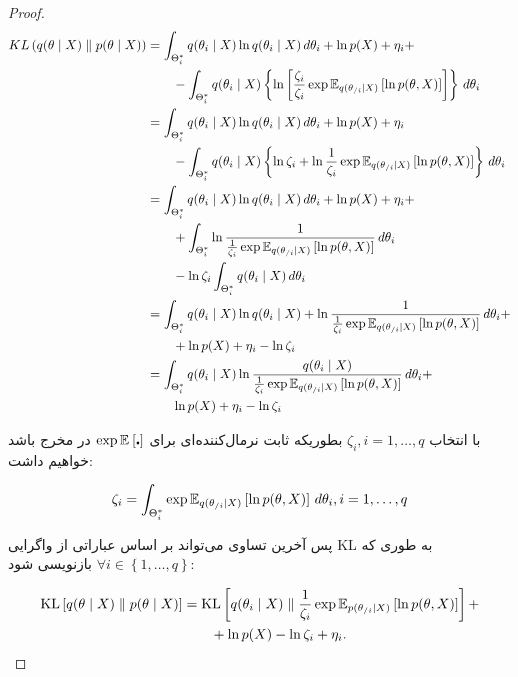 \begin{proof}
\begin{align*}
KL \left(  q ( \theta \mid X )  \parallel  p ( \theta \mid X )  \right)
	&= \int_{\Theta_i^*}  q ( \theta_i \mid X )  \ln  q ( \theta_i \mid X )  \,d\theta_i + \ln  p ( X )  + \eta_i +			\\
		& \qquad - \int_{\Theta_i^*}  q ( \theta_i \mid X )  \left\{
			\ln \left[
				\frac{\zeta_i}{\zeta_i} \exp  \mathbb{E}_{ q ( \theta_{/i} \mid X ) } \left[ \ln  p ( \theta, X )  \right]  \right] \right\} \,d\theta_i	\\
	&= \int_{\Theta_i^*}  q ( \theta_i \mid X )  \ln  q ( \theta_i \mid X )  \,d\theta_i + \ln  p ( X )  + \eta_i				\\
		& \qquad - \int_{\Theta_i^*}  q ( \theta_i \mid X )  \left\{
			\ln \zeta_i + \ln \frac{1}{\zeta_i} \exp  \mathbb{E}_{ q ( \theta_{/i} \mid X ) } \left[ \ln  p ( \theta, X )  \right]  \right\} \,d\theta_i	\\
	&= \int_{\Theta_i^*}  q ( \theta_i \mid X )  \ln  q ( \theta_i \mid X )  \,d\theta_i + \ln  p ( X )  + \eta_i +			\\
		& \qquad + \int_{\Theta_i^*} \ln \frac{1}{\frac{1}{\zeta_i} \exp  \mathbb{E}_{ q ( \theta_{/i} \mid X ) } \left[ \ln  p ( \theta, X )  \right] } \,d\theta_i		\\
		& \qquad - \ln \zeta_i \int_{\Theta_i^*}  q ( \theta_i \mid X )  \,d\theta_i													\\
	&= \int_{\Theta_i^*}  q ( \theta_i \mid X )  \ln  q ( \theta_i \mid X )  +
		\ln \frac{1}{\frac{1}{\zeta_i} \exp  \mathbb{E}_{ q ( \theta_{/i} \mid X ) } \left[ \ln  p ( \theta, X )  \right] } \,d\theta_i +					\\
		& \qquad + \ln  p ( X )  + \eta_i - \ln \zeta_i																					\\
	&= \int_{\Theta_i^*}  q ( \theta_i \mid X )  \ln \frac{
			 q ( \theta_i \mid X ) 
		}{
			\frac{1}{\zeta_i} \exp  \mathbb{E}_{ q ( \theta_{/i} \mid X ) } \left[ \ln  p ( \theta, X )  \right] 
		} \,d\theta_i +																														\\
		& \qquad \ln  p ( X )  + \eta_i - \ln \zeta_i
\end{align*}


با انتخاب
$\zeta_i, i = 1, \dots, q$
بطوریکه ثابت نرمال‌کننده‌ای برای
$\exp  \mathbb{E}_{} \left[ \centerdot \right] $
در مخرج باشد خواهیم داشت:


\begin{equation*}
	\zeta_i = \int_{\Theta_i^*} \exp  \mathbb{E}_{ q ( \theta_{/i} \mid X ) } \left[ \ln  p ( \theta, X )  \right]  \, d\theta_i, i = 1, \dots, q
\end{equation*}


پس آخرین تساوی می‌تواند بر اساس عباراتی از واگرایی
KL
به طوری که
$\forall i \in \left\{1, \dots, q \right\}$
بازنویسی شود:


\begin{align*}
 \operatorname{KL} \left[  q ( \theta \mid X )  \parallel  p ( \theta \mid X )  \right]  &=  \operatorname{KL} \left[ 
	 q ( \theta_i \mid X ) 
 \parallel 
	\frac{1}{\zeta_i} \exp  \mathbb{E}_{ p ( \theta_{/i} \mid X ) } \left[ \ln  p ( \theta, X )  \right] 
 \right]  + 																									\\
 & \qquad + \ln  p ( X )  - \ln \zeta_i + \eta_i.
\end{align*}

\end{proof}

